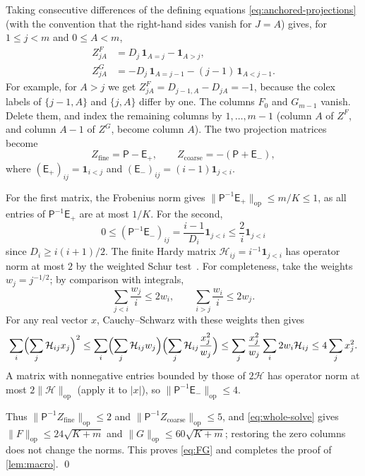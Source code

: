 \documentclass[11pt]{amsart}
\numberwithin{equation}{section}
\theoremstyle{definition}
\theoremstyle{remark}
\newcommand{\opnorm}[1]{\lVert #1\rVert_{\mathrm{op}}}
\newcommand{\one}{\mathbf 1}
\begin{document}
Taking consecutive differences of the defining equations
\eqref{eq:anchored-projections} (with the convention that the right-hand
sides vanish for $J=A$) gives, for $1\le j<m$ and $0\le A<m$,
\begin{align*}
 Z^F_{jA}&=D_j\,\one_{A=j}-\one_{A>j},\\
 Z^G_{jA}&=-D_j\,\one_{A=j-1}-(j-1)\,\one_{A<j-1}.
\end{align*}
For example, for $A>j$ we get $Z^F_{jA}=D_{j-1,A}-D_{jA}=-1$, because the
colex labels of $\{j-1,A\}$ and $\{j,A\}$ differ by one. The columns $F_0$
and $G_{m-1}$ vanish. Delete them, and index the remaining columns by
$1,\dots,m-1$ (column $A$ of $Z^F$, and column $A-1$ of $Z^G$, become
column $A$). The two projection matrices become
\[
 Z_{\mathrm{fine}}=\mathsf P-\mathsf E_+,\qquad
 Z_{\mathrm{coarse}}=-(\mathsf P+\mathsf E_-),
\]
where $(\mathsf E_+)_{ij}=\one_{i<j}$ and
$(\mathsf E_-)_{ij}=(i-1)\one_{j<i}$.

For the first matrix, the Frobenius norm gives
$\opnorm{\mathsf P^{-1}\mathsf E_+}\le m/K\le1$, as all entries of
$\mathsf P^{-1}\mathsf E_+$ are at most $1/K$. For the second,
\[
 0\le(\mathsf P^{-1}\mathsf E_-)_{ij}
 =\frac{i-1}{D_i}\one_{j<i}
 \le\frac2i\one_{j<i}
\]
since $D_i\ge i(i+1)/2$. The finite Hardy matrix
$\mathcal H_{ij}=i^{-1}\one_{j<i}$ has operator norm at most $2$ by the
weighted Schur test~\cite{Schur,Sinnamon}. For completeness, take
the weights $w_j=j^{-1/2}$; by comparison with integrals,
\[
 \sum_{j<i}\frac{w_j}{i}\le2w_i,
 \qquad \sum_{i>j}\frac{w_i}{i}\le2w_j.
\]
For any real vector $x$, Cauchy--Schwarz with these weights then gives
\[
 \sum_i\Bigl(\sum_j \mathcal H_{ij}x_j\Bigr)^2
 \le\sum_i\Bigl(\sum_j\mathcal H_{ij}w_j\Bigr)
          \Bigl(\sum_j\mathcal H_{ij}\frac{x_j^2}{w_j}\Bigr)
 \le\sum_j\frac{x_j^2}{w_j}\sum_i2w_i\mathcal H_{ij}
 \le4\sum_jx_j^2.
\]
A matrix with nonnegative entries bounded by those of $2\mathcal H$ has
operator norm at most $2\opnorm{\mathcal H}$ (apply it to $|x|$), so
$\opnorm{\mathsf P^{-1}\mathsf E_-}\le4$.

Thus $\opnorm{\mathsf P^{-1}Z_{\mathrm{fine}}}\le2$ and
$\opnorm{\mathsf P^{-1}Z_{\mathrm{coarse}}}\le5$, and
\eqref{eq:whole-solve} gives $\opnorm F\le24\sqrt{K+m}$ and
$\opnorm G\le60\sqrt{K+m}$; restoring the zero columns does not change
the norms. This proves \eqref{eq:FG} and completes the proof of
\cref{lem:macro}.
\qed
\end{document}
